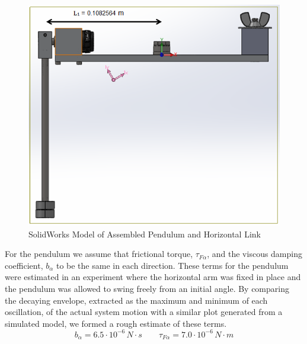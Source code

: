 \documentclass{article}
\theoremstyle{plain}
\theoremstyle{definition}
\theoremstyle{remark}
\begin{document}
\begin{figure}[htb]
\begin{center}
\includegraphics[width = 14cm]{CompleteArm.png}
\caption{SolidWorks Model of Assembled Pendulum and Horizontal Link}
\label{q2_5}
\end{center}
\end{figure}

For the pendulum we assume that frictional torque, $\tau_{F \alpha}$, and the viscous damping coefficient, $b_{\alpha}$ to be the same in each direction. These terms for the pendulum were estimated in an experiment where the horizontal arm was fixed in place and the pendulum was allowed to swing freely from an initial angle.  By comparing the decaying envelope, extracted as the maximum and minimum of each oscillation, of the actual system motion with a similar plot generated from a simulated model, we formed a rough estimate of these terms. \\

$$b_{\alpha} = 6.5\cdot10^{-6}\, N\cdot s \qquad \tau_{F \alpha} = 7.0\cdot10^{-6} \, N\cdot m$$
\end{document}
